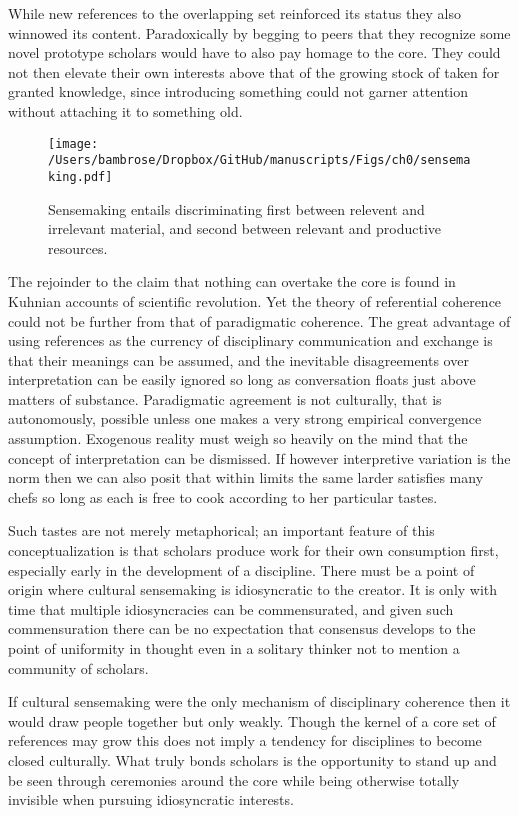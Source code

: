 \documentclass[]{article}
\begin{document}
While new references to the overlapping set reinforced its status they
also winnowed its content. Paradoxically by begging to peers that they
recognize some novel prototype scholars would have to also pay homage to
the core. They could not then elevate their own interests above that of
the growing stock of taken for granted knowledge, since introducing
something could not garner attention without attaching it to something
old.

\begin{figure}[htbp]
\centering
\texttt{[image: /Users/bambrose/Dropbox/GitHub/manuscripts/Figs/ch0/sensemaking.pdf]}
\caption{Sensemaking entails discriminating first between relevent and
irrelevant material, and second between relevant and productive
resources.}
\end{figure}

The rejoinder to the claim that nothing can overtake the core is found
in Kuhnian accounts of scientific revolution. Yet the theory of
referential coherence could not be further from that of paradigmatic
coherence. The great advantage of using references as the currency of
disciplinary communication and exchange is that their meanings can be
assumed, and the inevitable disagreements over interpretation can be
easily ignored so long as conversation floats just above matters of
substance. Paradigmatic agreement is not culturally, that is
autonomously, possible unless one makes a very strong empirical
convergence assumption. Exogenous reality must weigh so heavily on the
mind that the concept of interpretation can be dismissed. If however
interpretive variation is the norm then we can also posit that within
limits the same larder satisfies many chefs so long as each is free to
cook according to her particular tastes.

Such tastes are not merely metaphorical; an important feature of this
conceptualization is that scholars produce work for their own
consumption first, especially early in the development of a discipline.
There must be a point of origin where cultural sensemaking is
idiosyncratic to the creator. It is only with time that multiple
idiosyncracies can be commensurated, and given such commensuration there
can be no expectation that consensus develops to the point of uniformity
in thought even in a solitary thinker not to mention a community of
scholars.

If cultural sensemaking were the only mechanism of disciplinary
coherence then it would draw people together but only weakly. Though the
kernel of a core set of references may grow this does not imply a
tendency for disciplines to become closed culturally. What truly bonds
scholars is the opportunity to stand up and be seen through ceremonies
around the core while being otherwise totally invisible when pursuing
idiosyncratic interests.
\end{document}
